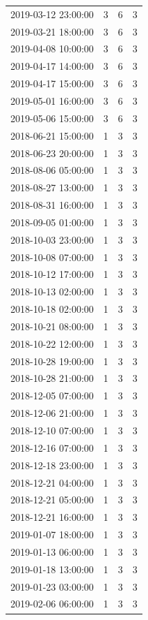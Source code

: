 \begin{tabular}{lrrr}
2019-03-12 23:00:00 & 3 & 6 & 3 \\
2019-03-21 18:00:00 & 3 & 6 & 3 \\
2019-04-08 10:00:00 & 3 & 6 & 3 \\
2019-04-17 14:00:00 & 3 & 6 & 3 \\
2019-04-17 15:00:00 & 3 & 6 & 3 \\
2019-05-01 16:00:00 & 3 & 6 & 3 \\
2019-05-06 15:00:00 & 3 & 6 & 3 \\
2018-06-21 15:00:00 & 1 & 3 & 3 \\
2018-06-23 20:00:00 & 1 & 3 & 3 \\
2018-08-06 05:00:00 & 1 & 3 & 3 \\
2018-08-27 13:00:00 & 1 & 3 & 3 \\
2018-08-31 16:00:00 & 1 & 3 & 3 \\
2018-09-05 01:00:00 & 1 & 3 & 3 \\
2018-10-03 23:00:00 & 1 & 3 & 3 \\
2018-10-08 07:00:00 & 1 & 3 & 3 \\
2018-10-12 17:00:00 & 1 & 3 & 3 \\
2018-10-13 02:00:00 & 1 & 3 & 3 \\
2018-10-18 02:00:00 & 1 & 3 & 3 \\
2018-10-21 08:00:00 & 1 & 3 & 3 \\
2018-10-22 12:00:00 & 1 & 3 & 3 \\
2018-10-28 19:00:00 & 1 & 3 & 3 \\
2018-10-28 21:00:00 & 1 & 3 & 3 \\
2018-12-05 07:00:00 & 1 & 3 & 3 \\
2018-12-06 21:00:00 & 1 & 3 & 3 \\
2018-12-10 07:00:00 & 1 & 3 & 3 \\
2018-12-16 07:00:00 & 1 & 3 & 3 \\
2018-12-18 23:00:00 & 1 & 3 & 3 \\
2018-12-21 04:00:00 & 1 & 3 & 3 \\
2018-12-21 05:00:00 & 1 & 3 & 3 \\
2018-12-21 16:00:00 & 1 & 3 & 3 \\
2019-01-07 18:00:00 & 1 & 3 & 3 \\
2019-01-13 06:00:00 & 1 & 3 & 3 \\
2019-01-18 13:00:00 & 1 & 3 & 3 \\
2019-01-23 03:00:00 & 1 & 3 & 3 \\
2019-02-06 06:00:00 & 1 & 3 & 3 \\

\end{tabular}
